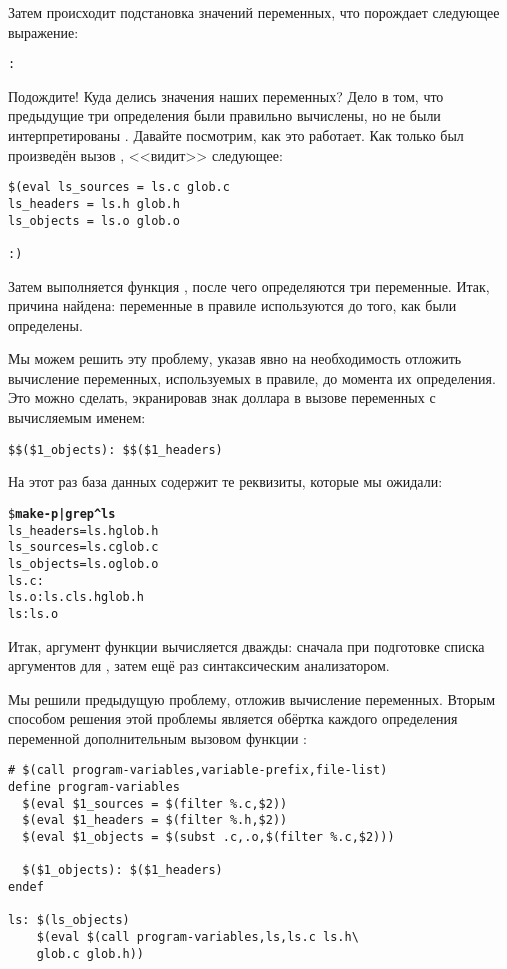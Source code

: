 Затем происходит подстановка значений переменных, что порождает
следующее выражение:

{\footnotesize
\begin{verbatim}
:
\end{verbatim}
}

Подождите! Куда делись значения наших переменных? Дело в том, что
предыдущие три определения были правильно вычислены, но не были
интерпретированы \GNUmake{}. Давайте посмотрим, как это работает.  Как
только был произведён вызов , \GNUmake{}
<<видит>> следующее:

{\footnotesize
\begin{verbatim}
$(eval ls_sources = ls.c glob.c
ls_headers = ls.h glob.h
ls_objects = ls.o glob.o

:)
\end{verbatim}
}

Затем выполняется функция , после чего определяются три
переменные. Итак, причина найдена: переменные в правиле используются
до того, как были определены.

Мы можем решить эту проблему, указав явно на необходимость отложить
вычисление переменных, используемых в правиле, до момента их
определения.  Это можно сделать, экранировав знак доллара в вызове
переменных с вычисляемым именем:

{\footnotesize
\begin{verbatim}
$$($1_objects): $$($1_headers)
\end{verbatim}
}

На этот раз база данных \GNUmake{} содержит те реквизиты, которые мы
ожидали:

{\footnotesize
\begin{alltt}
\${} \textbf{make -p | grep \^{}ls}
ls\_headers = ls.h glob.h
ls\_sources = ls.c glob.c
ls\_objects = ls.o glob.o
ls.c:
ls.o: ls.c ls.h glob.h
ls: ls.o
\end{alltt}
}

Итак, аргумент функции  вычисляется дважды: сначала при
подготовке списка аргументов для , затем ещё раз
синтаксическим анализатором.

Мы решили предыдущую проблему, отложив вычисление переменных. Вторым
способом решения этой проблемы является обёртка каждого определения
переменной дополнительным вызовом функции :

{\footnotesize
\begin{verbatim}
# $(call program-variables,variable-prefix,file-list)
define program-variables
  $(eval $1_sources = $(filter %.c,$2))
  $(eval $1_headers = $(filter %.h,$2))
  $(eval $1_objects = $(subst .c,.o,$(filter %.c,$2)))

  $($1_objects): $($1_headers)
endef

ls: $(ls_objects)
    $(eval $(call program-variables,ls,ls.c ls.h\
	glob.c glob.h))
\end{verbatim}
}

